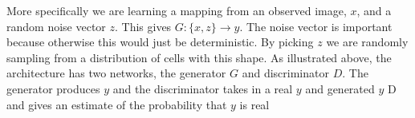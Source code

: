 \documentclass[ms,electronic,oneside,twosidetoc,letterpaper,chaptercenter,parttop]{byumsphd}
\begin{document}
More specifically we are learning a mapping from an observed image, $x$, and a random noise vector $z$. This 
gives $G: \{ x, z \} \rightarrow y$. The noise vector is important because otherwise this would just be deterministic.
By picking $z$ we are randomly sampling from a distribution of cells with this shape. 
As illustrated above, the architecture has two networks, the generator $G$ and discriminator $D$. The generator
produces $y$ and the discriminator takes in a real $y$ and generated $y$ D and gives an estimate of the 
probability that $y$ is real


\end{document}
